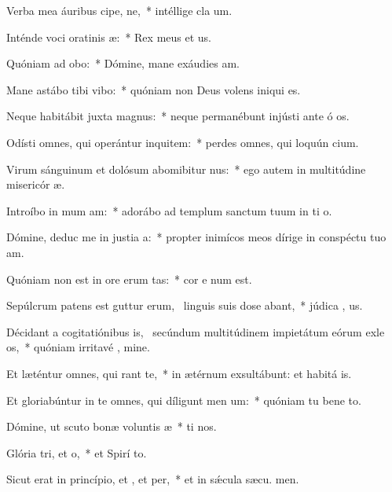 \item Verba mea áuribus cipe, ne,~* intéllige cla um.
\item Inténde voci oratinis æ:~* Rex meus et  us.
\item Quóniam ad  obo:~* Dómine, mane exáudies  am.
\item Mane astábo tibi  vibo:~* quóniam non Deus volens iniqui  es.
\item Neque habitábit juxta  magnus:~* neque permanébunt injústi ante ó os.
\item Odísti omnes, qui operántur inquitem:~* perdes omnes, qui loquún cium.
\item Virum sánguinum et dolósum abomibitur nus:~* ego autem in multitúdine misericór æ.
\item Introíbo in mum am:~* adorábo ad templum sanctum tuum in ti o.
\item Dómine, deduc me in justia a:~* propter inimícos meos dírige in conspéctu tuo  am.
\item Quóniam non est in ore erum tas:~* cor e num est.
\item Sepúlcrum patens est guttur erum,~\pscross{} linguis suis dose abant,~* júdica , us.
\item Décidant a cogitatiónibus is,~\pscross{} secúndum multitúdinem impietátum eórum exle os,~* quóniam irritavé , mine.
\item Et læténtur omnes, qui rant  te,~* in ætérnum exsultábunt: et habitá  is.
\item Et gloriabúntur in te omnes, qui díligunt men um:~* quóniam tu bene to.
\item Dómine, ut scuto bonæ voluntis æ~* ti nos.
\item Glória tri, et o,~* et Spirí to.
\item Sicut erat in princípio, et , et per,~* et in sǽcula sæcu. men.
